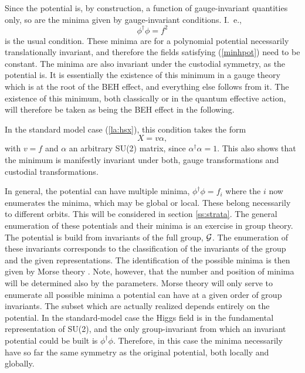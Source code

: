 \documentclass[final,12pt]{article}
\newcommand*{\no}{\noindent}
\newcommand*{\be}{\begin{equation}}
\newcommand*{\ee}{\end{equation}}
\newcommand*{\pref}[1]{(\ref{#1})}
\newcommand*{\nn}{\nonumber}
\newcommand*{\1}{1\!\!\!\bot}
\begin{document}
Since the potential is, by construction, a function of gauge-invariant quantities only, so are the minima given by gauge-invariant conditions. I.\ e.,
\be
\phi^\dagger\phi=f^2\label{minhpot}
\ee
\no is the usual condition. These minima are for a polynomial potential necessarily translationally invariant, and therefore the fields satisfying \pref{minhpot} need to be constant. The minima are also invariant under the custodial symmetry, as the potential is. It is essentially the existence of this minimum in a gauge theory which is at the root of the BEH effect, and everything else follows from it. The existence of this minimum, both classically or in the quantum effective action, will therefore be taken as being the BEH effect in the following.

In the standard model case \pref{la:hsx}, this condition takes the form
\be
X=v\alpha\nn,
\ee
\no with $v=f$ and $\alpha$ an arbitrary SU(2) matrix, since $\alpha^\dagger\alpha=1$. This also shows that the minimum is manifestly invariant under both, gauge transformations and custodial transformations.

In general, the potential can have multiple minima, $\phi^\dagger\phi=f_i$ where the $i$ now enumerates the minima, which may be global or local. These belong necessarily to different orbits. This will be considered in section \ref{ss:strata}. The general enumeration of these potentials and their minima is an exercise in group theory. The potential is build from invariants of the full group, ${\cal G}$. The enumeration of these invariants corresponds to the classification of the invariants of the group and the given representations. The identification of the possible minima is then given by Morse theory \cite{O'Raifeartaigh:1986vq,Sartori:1992ib}. Note, however, that the number and position of minima will be determined also by the parameters. Morse theory will only serve to enumerate all possible minima a potential can have at a given order of group invariants. The subset which are actually realized depends entirely on the potential. In the standard-model case the Higgs field is in the fundamental representation of SU(2), and the only group-invariant from which an invariant potential could be built is $\phi^\dagger\phi$. Therefore, in this case the minima necessarily have so far the same symmetry as the original potential, both locally and globally.
\end{document}
